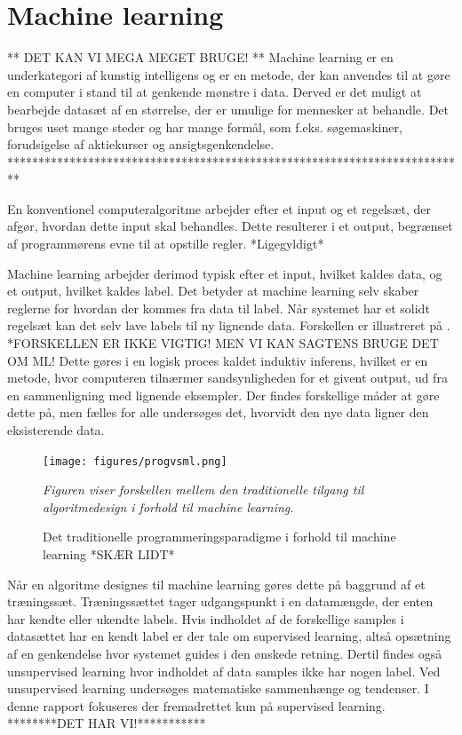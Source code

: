 \section{Machine learning}

** DET KAN VI MEGA MEGET BRUGE! **
Machine learning er en underkategori af kunstig intelligens og er en metode, der kan anvendes til at gøre en computer i stand til at genkende mønstre i data. Derved er det muligt at bearbejde datasæt af en størrelse, der er umulige for mennesker at behandle. Det bruges uset mange steder og har mange formål, som f.eks. søgemaskiner, forudsigelse af aktiekurser og ansigtsgenkendelse.\cite{DIKU2010}  \\
**************************************************************************

En konventionel computeralgoritme arbejder efter et input og et regelsæt, der afgør, hvordan dette input skal behandles. Dette resulterer i et output, begrænset af programmørens evne til at opstille regler. *Ligegyldigt*

Machine learning arbejder derimod typisk efter et input, hvilket kaldes data, og et output, hvilket kaldes label. Det betyder at machine learning selv skaber reglerne for hvordan der kommes fra data til label. Når systemet har et solidt regelsæt kan det selv lave labels til ny lignende data. Forskellen er illustreret på . *FORSKELLEN ER IKKE VIGTIG! MEN VI KAN SAGTENS BRUGE DET OM ML! Dette gøres i en logisk proces kaldet induktiv inferens, hvilket er en metode, hvor computeren tilnærmer sandsynligheden for et givent output, ud fra en sammenligning med lignende eksempler. Der findes forskellige måder at gøre dette på, men fælles for alle undersøges det, hvorvidt den nye data ligner den eksisterende data.\cite{DIKU2010}

\begin{figure}[H]
	\centering
	\texttt{[image: figures/progvsml.png]}
	\caption{Det traditionelle programmeringsparadigme i forhold til machine learning *SKÆR LIDT*}
	\label{progvsml}
	\textit{Figuren viser forskellen mellem den traditionelle tilgang til algoritmedesign i forhold til machine learning.}
\end{figure}

Når en algoritme designes til machine learning gøres dette på baggrund af et træningssæt. \cite{DIKU2010} Træningssættet tager udgangspunkt i en datamængde, der enten har kendte eller ukendte labels. Hvis indholdet af de forskellige samples i datasættet har en kendt label er der tale om supervised learning, altså opsætning af en genkendelse hvor systemet guides i den ønskede retning. \cite{Brownlee2013} Dertil findes også unsupervised learning hvor indholdet af data samples ikke har nogen label. Ved unsupervised learning undersøges matematiske sammenhænge og tendenser. \cite{Brownlee2013} I denne rapport fokuseres der fremadrettet kun på supervised learning. \\
********DET HAR VI!***********


